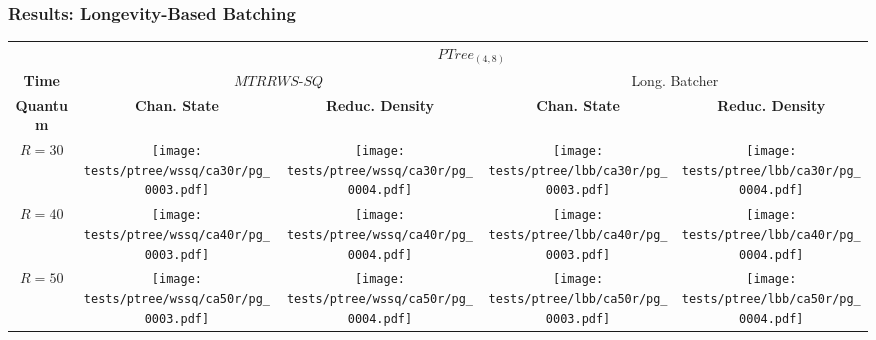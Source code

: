 \begin{slide}
\frametitle{Results: Longevity-Based Batching}
{\scriptsize
\begin{table}
    \centering
    \begin{tabular}{ccccc} & \multicolumn{4}{c}{ $PTree_{(4,8)}$ } \\ \cline{2-5}
    \multicolumn{1}{c}{\textbf{Time}} & \multicolumn{2}{c}{ $MTRRWS$-$SQ$ } & \multicolumn{2}{c}{ Long. Batcher} \\ \cline{2-5}
    \multicolumn{1}{c|}{\textbf{Quantum}} & \textbf{Chan. State} & \multicolumn{1}{c|}{\textbf{Reduc. Density}} 
                                                & \textbf{Chan. State} & \multicolumn{1}{c|}{\textbf{Reduc. Density}} \\ \cline{1-5}
    \multicolumn{1}{c|}{$R=30$} &  \multicolumn{1}{c}{\texttt{[image: tests/ptree/wssq/ca30r/pg\_0003.pdf]}} &
                                   \multicolumn{1}{c|}{\texttt{[image: tests/ptree/wssq/ca30r/pg\_0004.pdf]}} &
                                   \multicolumn{1}{c}{\texttt{[image: tests/ptree/lbb/ca30r/pg\_0003.pdf]}} &
                                   \multicolumn{1}{c|}{\texttt{[image: tests/ptree/lbb/ca30r/pg\_0004.pdf]}} \\ \cline{1-5}

    \multicolumn{1}{c|}{$R=40$} &  \multicolumn{1}{c}{\texttt{[image: tests/ptree/wssq/ca40r/pg\_0003.pdf]}} &
                                   \multicolumn{1}{c|}{\texttt{[image: tests/ptree/wssq/ca40r/pg\_0004.pdf]}} &
                                   \multicolumn{1}{c}{\texttt{[image: tests/ptree/lbb/ca40r/pg\_0003.pdf]}} &
                                   \multicolumn{1}{c|}{\texttt{[image: tests/ptree/lbb/ca40r/pg\_0004.pdf]}} \\ \cline{1-5}

    \multicolumn{1}{c|}{$R=50$} &  \multicolumn{1}{c}{\texttt{[image: tests/ptree/wssq/ca50r/pg\_0003.pdf]}} &
                                   \multicolumn{1}{c|}{\texttt{[image: tests/ptree/wssq/ca50r/pg\_0004.pdf]}} &
                                   \multicolumn{1}{c}{\texttt{[image: tests/ptree/lbb/ca50r/pg\_0003.pdf]}} &
                                   \multicolumn{1}{c|}{\texttt{[image: tests/ptree/lbb/ca50r/pg\_0004.pdf]}} \\ \cline{1-5}
    \end{tabular}
\end{table}
}
\end{slide}
